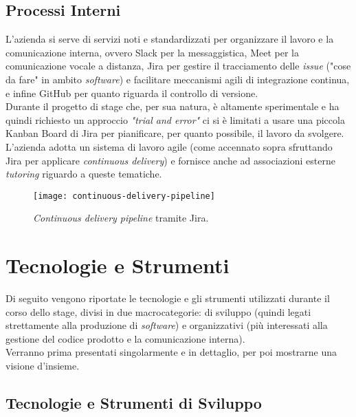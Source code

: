 \subsection{Processi Interni}
L'azienda si serve di servizi noti e standardizzati per organizzare il lavoro e la comunicazione interna, ovvero Slack per la messaggistica, Meet per la comunicazione vocale a distanza, Jira per gestire il tracciamento delle \textit{issue} ("cose da fare" in ambito \textit{software}) e facilitare meccanismi agili di integrazione continua, e infine GitHub per quanto riguarda il controllo di versione.\\
Durante il progetto di stage che, per sua natura, è altamente sperimentale e ha quindi richiesto un approccio \textit{"trial and error"} ci si è limitati a usare una piccola Kanban Board di Jira per pianificare, per quanto possibile, il lavoro da svolgere.\\
L'azienda adotta un sistema di lavoro agile (come accennato sopra sfruttando Jira per applicare \textit{continuous delivery}) e fornisce anche ad associazioni esterne \textit{tutoring} riguardo a queste tematiche. 
\begin{figure}[H]
    \centering
    \texttt{[image: continuous-delivery-pipeline]}
    \caption[Jira \textit{continuous delivery pipeline}]{\textit{Continuous delivery pipeline} tramite Jira.\footnotemark}
\end{figure}

\section{Tecnologie e Strumenti}
\label{sec:tecnologie-e-strumenti}
Di seguito vengono riportate le tecnologie e gli strumenti utilizzati durante il corso dello stage, divisi in due macrocategorie: di sviluppo (quindi legati strettamente alla produzione di \textit{software}) e organizzativi (più interessati alla gestione del codice prodotto e la comunicazione interna).\\
Verranno prima presentati singolarmente e in dettaglio, per poi mostrarne una visione d'insieme.

\subsection{Tecnologie e Strumenti di Sviluppo}
